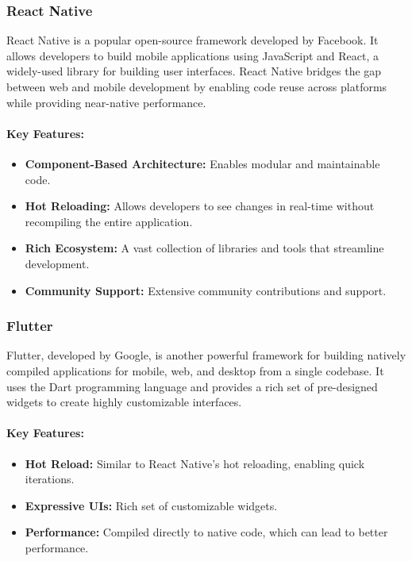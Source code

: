 \subsubsection{React Native}

React Native is a popular open-source framework developed by Facebook. It allows developers to build mobile applications using JavaScript and React, a widely-used library for building user interfaces. React Native bridges the gap between web and mobile development by enabling code reuse across platforms while providing near-native performance\cite{ReactNativeBook}.

\paragraph{Key Features:}

\begin{itemize}
    \item \textbf{Component-Based Architecture:} Enables modular and maintainable code.
    \item \textbf{Hot Reloading:} Allows developers to see changes in real-time without recompiling the entire application.
    \item \textbf{Rich Ecosystem:} A vast collection of libraries and tools that streamline development.
    \item \textbf{Community Support:} Extensive community contributions and support.
\end{itemize}

\subsubsection{Flutter}

Flutter, developed by Google, is another powerful framework for building natively compiled applications for mobile, web, and desktop from a single codebase. It uses the Dart programming language and provides a rich set of pre-designed widgets to create highly customizable interfaces\cite{Flutter}.

\paragraph{Key Features:}

\begin{itemize}
    \item \textbf{Hot Reload:} Similar to React Native's hot reloading, enabling quick iterations.
    \item \textbf{Expressive UIs:} Rich set of customizable widgets.
    \item \textbf{Performance:} Compiled directly to native code, which can lead to better performance.
\end{itemize}

